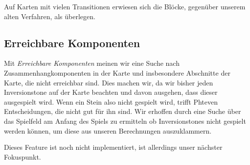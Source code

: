 Auf Karten mit vielen Transitionen erwiesen sich die Blöcke, gegenüber unserem alten Verfahren, als überlegen.

\subsection{Erreichbare Komponenten}
Mit \textit{Erreichbare Komponenten} meinen wir eine Suche nach Zusammenhangkomponenten in der Karte und insbesondere Abschnitte der Karte, die nicht erreichbar sind. Dies machen wir, da wir bisher jeden Inversionstone auf der Karte beachten und davon ausgehen, dass dieser ausgespielt wird. Wenn ein Stein also nicht gespielt wird, trifft Phteven Entscheidungen, die nicht gut für ihn sind. Wir erhoffen durch eine Suche über das Spielfeld am Anfang des Spiels zu ermitteln ob Inversionstones nicht gespielt werden können, um diese aus unseren Berechnungen auszuklammern.

Dieses Feature ist noch nicht implementiert, ist allerdings unser nächster Fokuspunkt.